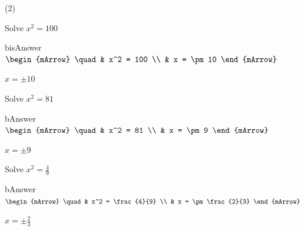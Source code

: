 \clearpage\noindent%
\begin{mtask}[resume](2)
   \task \begin{exercise} Solve $x^2=100$
              \begin{envOut}[height=3cm]{bisAnswer}
			     $\begin{mArrow}
			          \quad & x^2 = 100      \\
                            & x = \pm 10					  
				  \end{mArrow}$				 
               \end{envOut}                 
			   \begin{shortsolution}  
				       $x = \pm 10$
			   \end{shortsolution}
         \end{exercise}
		 
   \task \begin{exercise} Solve $x^2=81$
              \begin{envOut}[height=3cm]{bAnswer}
			     $\begin{mArrow}
			          \quad & x^2 = 81      \\
                            & x = \pm 9					  
				  \end{mArrow}$
               \end{envOut}
               \begin{shortsolution}  
				       $x = \pm 9$
			   \end{shortsolution}				 
         \end{exercise}

   \task \begin{exercise} Solve $x^2=\frac{4}{9}$
              \begin{envOut}[height=5cm]{bAnswer}
			     $\begin{mArrow}
			          \quad & x^2 = \frac{4}{9}      \\
                            & x = \pm \frac{2}{3}					  
				  \end{mArrow}$
               \end{envOut}
               \begin{shortsolution}  
				       $x = \pm \frac{2}{3}$
			   \end{shortsolution}				 
         \end{exercise}
\end{mtask}
\clearpage


